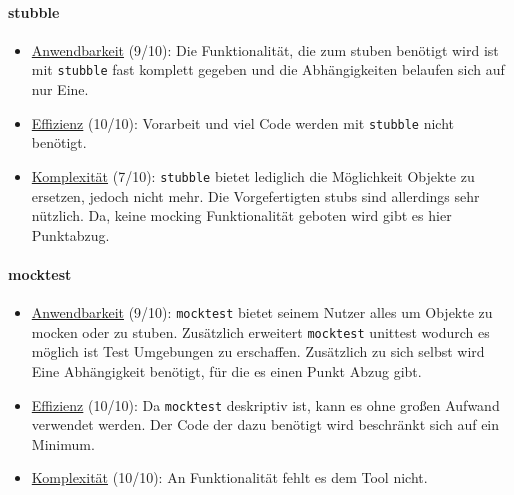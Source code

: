 \paragraph{stubble}\label{zusammenfassung:mock:stubble}\mbox{}
\newline
\begin{itemize}
    \item \underline{Anwendbarkeit} (9/10):\newline
    Die Funktionalität, die zum \gls{stub}en benötigt wird ist mit
    \lstinline{stubble} fast komplett gegeben und die Abhängigkeiten belaufen
    sich auf nur Eine.
    
    \item \underline{Effizienz} (10/10):\newline
    Vorarbeit und viel Code werden mit \lstinline{stubble} nicht benötigt.
    
    \item \underline{Komplexität} (7/10):\newline
    \lstinline{stubble} bietet lediglich die Möglichkeit Objekte zu ersetzen,
    jedoch nicht mehr. Die Vorgefertigten \Glspl{stub} sind allerdings sehr
    nützlich. Da, keine \gls{mock}ing Funktionalität geboten wird gibt es hier
    Punktabzug.
\end{itemize}

\paragraph{mocktest}\label{zusammenfassung:mock:mocktest}\mbox{}
\newline
\begin{itemize}
    \item \underline{Anwendbarkeit} (9/10):\newline
    \lstinline{mocktest} bietet seinem Nutzer alles um Objekte zu \gls{mock}en
    oder zu \gls{stub}en. Zusätzlich erweitert \lstinline{mocktest} unittest
    wodurch es möglich ist Test Umgebungen zu erschaffen. Zusätzlich zu sich
    selbst wird Eine Abhängigkeit benötigt, für die es einen Punkt Abzug gibt.
    
    \item \underline{Effizienz} (10/10):\newline
    Da \lstinline{mocktest} deskriptiv ist, kann es ohne großen Aufwand
    verwendet werden. Der Code der dazu benötigt wird beschränkt sich auf
    ein Minimum.
    
    \item \underline{Komplexität} (10/10):\newline
    An Funktionalität fehlt es dem Tool nicht.

\end{itemize}

